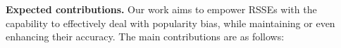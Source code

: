 %


\textbf{Expected contributions.} %
Our work aims to empower RSSEs %
with the capability to effectively deal with popularity bias, while maintaining or even enhancing their accuracy. The main contributions are as follows: %

